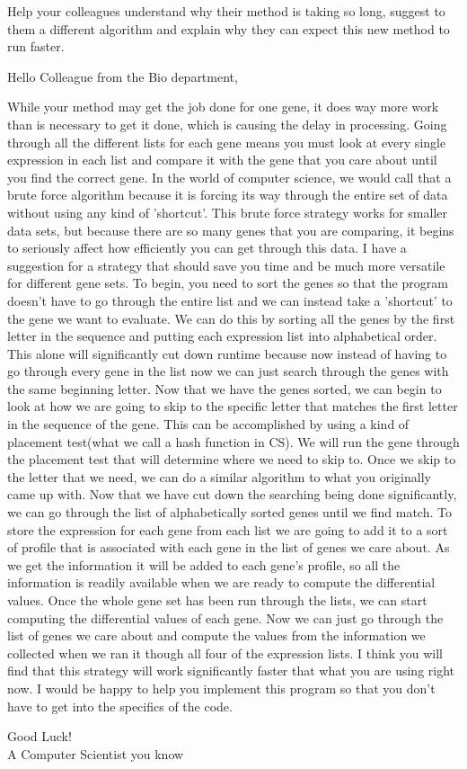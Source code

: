 \documentclass[12pt]{article}
\begin{document}
Help your colleagues understand why their method is taking so long, suggest to them a different algorithm and explain why they can expect this new method to run faster.
\pagebreak

\newpage

Hello Colleague from the Bio department,

While your method may get the job done for one gene, it does way more work than is necessary to get it done, which is causing the delay in processing. Going through all the different lists for each gene means you must look at every single expression in each list and compare it with the gene that you care about until you find the correct gene. In the world of computer science, we would call that a brute force algorithm because it is forcing its way through the entire set of data without using any kind of 'shortcut'. This brute force strategy works for smaller data sets, but because there are so many genes that you are comparing, it begins to seriously affect how efficiently you can get through this data. I have a suggestion for a strategy that should save you time and be much more versatile for different gene sets. To begin, you need to sort the genes so that the program doesn’t have to go through the entire list and we can instead take a 'shortcut' to the gene we want to evaluate. We can do this by sorting all the genes by the first letter in the sequence and putting each expression list into alphabetical order. This alone will significantly cut down runtime because now instead of having to go through every gene in the list now we can just search through the genes with the same beginning letter. Now that we have the genes sorted, we can begin to look at how we are going to skip to the specific letter that matches the first letter in the sequence of the gene. This can be accomplished by using a kind of placement test(what we call a hash function in CS). We will run the gene through the placement test that will determine where we need to skip to. Once we skip to the letter that we need, we can do a similar algorithm to what you originally came up with. Now that we have cut down the searching being done significantly, we can go through the list of alphabetically sorted genes until we find match. To store the expression for each gene from each list we are going to add it to a sort of profile that is associated with each gene in the list of genes we care about. As we get the information it will be added to each gene's profile, so all the information is readily available when we are ready to compute the differential values. Once the whole gene set has been run through the lists, we can start computing the differential values of each gene. Now we can just go through the list of genes we care about and compute the values from the information we collected when we ran it though all four of the expression lists. I think you will find that this strategy will work significantly faster that what you are using right now. I would be happy to help you implement this program so that you don't have to get into the specifics of the code. 

Good Luck!
\\A Computer Scientist you know

\mbox{}
\newpage
\pagebreak
\end{document}
